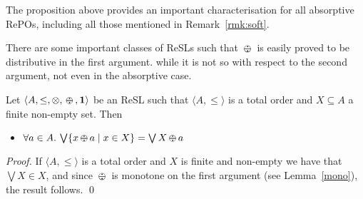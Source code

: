 \documentclass{llncs}
\def\monid{{\mathbf 0}}
\def\monop{\otimes}
\def\odiv{\, {\ominus\hspace{-7.7pt} \div} \,}
\def\monid{\mathbf{1}}
\begin{document}

\begin{remark}\label{rmk:softUnit}
The proposition above provides an important characterisation for all absorptive RePOs, including all those mentioned in Remark~\ref{rmk:soft}.
\end{remark}

There are some important classes of ReSLs  such that $\odiv$ is easily proved to be distributive in the first argument.
while it is not so with respect to the second argument, not even in the absorptive case.

\begin{lemma}
	\label{distodiv}
	Let $\langle A, \leq, \monop, \odiv, \monid \rangle$ be an ReSL such that $\langle A, \leq \rangle$ is a total order and $X \subseteq A$ a finite non-empty set. Then 
	\begin{itemize}
		\item $\forall a \in A.\, \bigvee \{ x \odiv a \mid x \in X \} = \bigvee X \odiv a$
	\end{itemize}	
\end{lemma}

\begin{proof}
If $\langle A, \leq \rangle$ is a total order and $X$ is finite and non-empty we have that $\bigvee X \in X$, and since $\odiv$ 
is monotone on the first argument (see Lemma~\ref{mono}), the result follows.
\qed
\end{proof}
\end{document}
